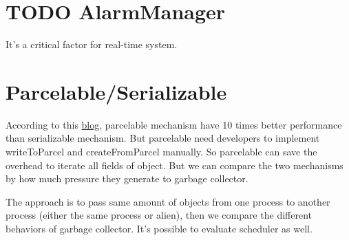 \documentclass[11pt]{article}
\begin{document}
\section{{\bfseries\sffamily TODO} AlarmManager}
\label{sec-6}
It's a critical factor for real-time system.

\section{Parcelable/Serializable}
\label{sec-7}
According to this \href{http://www.developerphil.com/parcelable-vs-serializable/}{blog}, parcelable mechanism have 10 times better performance than serializable mechanism.
But parcelable need developers to implement writeToParcel and createFromParcel manually.
So parcelable can save the overhead to iterate all fields of object.
But we can compare the two mechanisms by how much pressure they generate to garbage collector.

The approach is to pass same amount of objects from one process to another process (either the same process or alien),
then we compare the different behaviors of garbage collector.
It's possible to evaluate scheduler as well.
\end{document}
